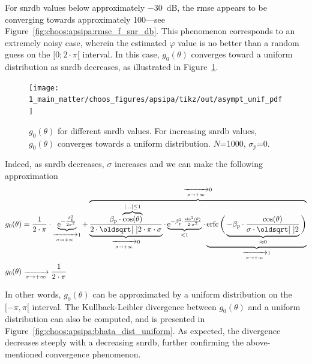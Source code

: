 For \gls{snrdb} values below approximately $-30$~dB, the \gls{rmse} appears to be converging towards approximately 100{\degree}---see Figure~\ref{fig:choos:apsipa:rmse_f_snr_db}. This phenomenon corresponds to an extremely noisy case, wherein the estimated $\varphi$ value is no better than a random guess on the $[0;2\cdot \pi[$ interval. In this case, $g_0(\theta)$ converges toward a uniform distribution as \gls{snrdb} decreases, as illustrated in Figure~\ref{fig:choos:apsipa:pdf_g_uniform}.

\begin{figure}
	\centering
	\texttt{[image: 1\_main\_matter/choos\_figures/apsipa/tikz/out/asympt\_unif\_pdf]}
	\caption[$g_0(\theta)$ for different \gls{snrdb} values.]{$g_0(\theta)$ for different \gls{snrdb} values. For increasing \gls{snrdb} values, $g_0(\theta)$ converges towards a uniform distribution. $N$=1000, $\sigma_p$=0.}
	\label{fig:choos:apsipa:pdf_g_uniform}
\end{figure}

Indeed, as \gls{snrdb} decreases, $\sigma$ increases and we can make the following approximation
\begin{equation}
	\begin{aligned}
		&g_0(\theta) = \frac{1}{2\cdot \pi} \cdot \underbrace{\e^{-\frac{\beta_p^2}{2 \sigma^2}}}_{\xrightarrow[\sigma \rightarrow + \infty]{} 1} + \overbrace{\underbrace{\frac{\beta_p \cdot \overbrace{\cos(\theta)}^{|...| \leq 1}}{2 \cdot \sqrt{2 \cdot \pi} \cdot \sigma}}_{\xrightarrow[\sigma \rightarrow + \infty]{} 0} \cdot \underbrace{\e^{-\beta_p^2 \cdot \frac{\sin^2(\theta)}{2\cdot \sigma^2}}}_{< 1} \cdot \underbrace{\erfc\bigg(\underbrace{- \beta_p \cdot \frac{\cos(\theta)}{\sigma \cdot \sqrt{2}}}_{\approx 0}\bigg)}_{\xrightarrow[\sigma \rightarrow + \infty]{} 1}}^{\xrightarrow[\sigma \rightarrow + \infty]{} 0} \\
		& g_0(\theta) \xrightarrow[\sigma \rightarrow + \infty]{} \frac{1}{2 \cdot \pi}
	\end{aligned}
\end{equation}

In other words, $g_0(\theta)$ can be approximated by a uniform distribution on the $[-\pi, \pi[$ interval. The Kullback-Leibler divergence between $g_0(\theta)$ and a uniform distribution can also be computed, and is presented in Figure~\ref{fig:choos:apsipa:bhata_dist_uniform}. As expected, the divergence decreases steeply with a decreasing \gls{snrdb}, further confirming the above-mentioned convergence phenomenon.

